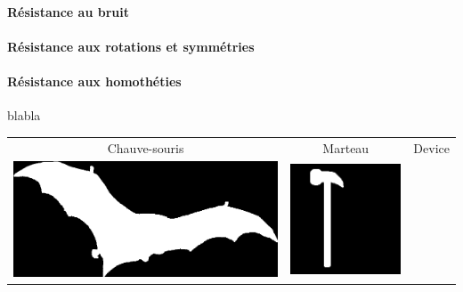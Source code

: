 \documentclass{article}
\begin{document}
	\paragraph{Résistance au bruit}
	
	\paragraph{Résistance aux rotations et symmétries}
      
	\paragraph{Résistance aux homothéties} blabla
	
	
	  \begin{table}
	  \centering      
	  \begin{tabular}{|c|c|c|c|c|c|}
	    \hline
	    \multicolumn{2}{|c|}{Chauve-souris} & \multicolumn{2}{|c|}{Marteau} & \multicolumn{2}{|c|}{Device}  \\
	    \multicolumn{2}{|c|}{\includegraphics[scale=0.11]{Illustrations/bat-2.png}} 
	    & \multicolumn{2}{|c|}{\includegraphics[scale=0.15]{Illustrations/hammer-20.png}} 

\end{tabular}
\end{table}
\end{document}
